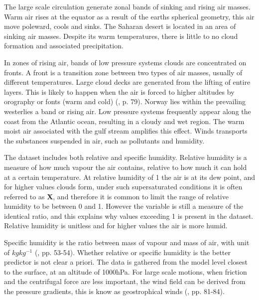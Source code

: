 The large scale circulation generate zonal bands of sinking and rising air masses. Warm air rises at the equator as a result of the earths spherical geometry, this air move poleward, cools and sinks. The Saharan desert is located in an area of sinking air masses. Despite its warm temperatures, there is little to no cloud formation and associated precipitation. 

In zones of rising air, bands of low pressure systems clouds are concentrated on fronts. A front is a transition zone between two types of air masses, usually of different temperatures. %
Large cloud decks are generated from the lifting of entire layers. This is likely to happen when the air is forced to higher altitudes by orography or fonts (warm and cold) (\cite{lohmann2016}, p. 79). Norway lies within the prevailing westerlies a band or rising air. Low pressure systems frequently appear along the coast from the Atlantic ocean, resulting in a cloudy and wet region. The warm moist air associated with the gulf stream amplifies this effect. Winds transports the substances suspended in air, such as pollutants and humidity. 

The dataset includes both relative and specific humidity. Relative humidity is a measure of how much vapour the air contains, relative to how much it can hold at a certain temperature. At relative humidity of 1 the air is at its dew point, and for higher values clouds form, under such supersaturated conditions it is often referred to as \textbf{X}, and therefore it is common to limit the range of relative humidity to be between 0 and 1. However the variable is still a measure of the identical ratio, and this explains why values exceeding 1 is present in the dataset. Relative humidity is unitless and for higher values the air is more humid.

Specific humidity is the ratio between mass of vapour and mass of air, with unit of $kg kg^{-1}$ (\cite{lohmann2016}, pp. 53-54). Whether relative or specific humidity is the better predictor is not clear a priori. The data is gathered from the model level closest to the surface, at an altitude of 1000hPa. For large scale motions, when friction and the centrifugal force are less important, the wind field can be derived from the pressure gradients, this is know as geostrophical winds  (\cite{lohmann2016}, pp. 81-84).

